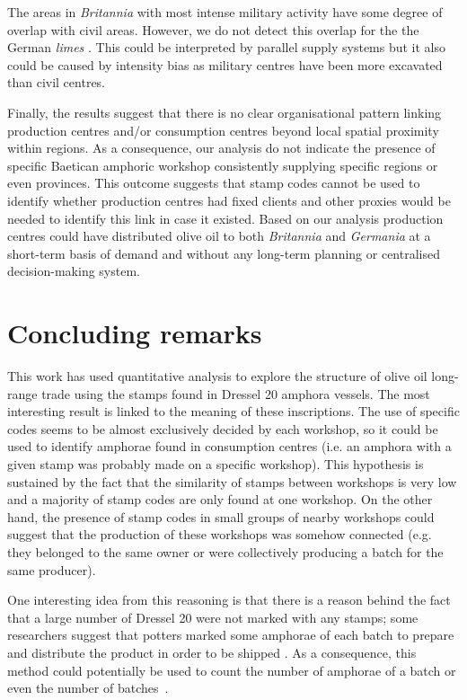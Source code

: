 The areas in \textit{Britannia} with most intense military activity have some degree of overlap with civil areas. However, we do not detect this overlap for the the German \textit{limes} \citep{xanten2018}. This could be interpreted by parallel supply systems but it also could be caused by intensity bias as military centres have been more excavated than civil centres.


Finally, the results suggest that there is no clear organisational pattern linking production centres and/or consumption centres beyond local spatial proximity within regions. As a consequence, our analysis do not indicate the presence of specific Baetican amphoric workshop consistently supplying specific regions or even provinces.  This outcome suggests that stamp codes cannot be used to identify whether production centres had fixed clients and other proxies would be needed to identify this link in case it existed. Based on our analysis production centres could have distributed olive oil to both \textit{Britannia} and \textit{Germania} at a short-term basis of demand and without any long-term planning or centralised decision-making system.

\section{Concluding remarks}
\label{sec:8}

This work has used quantitative analysis to explore the structure of olive oil long-range trade using the stamps found in Dressel 20 amphora vessels. The most interesting result is linked to the meaning of these inscriptions. The use of specific codes seems to be almost exclusively decided by each workshop, so it could be used to identify amphorae found in consumption centres (i.e. an amphora with a given stamp was probably made on a specific workshop). This hypothesis is sustained by the fact that the similarity of stamps between workshops is very low and a majority of stamp codes are only found at one workshop. On the other hand, the presence of stamp codes in small groups of nearby workshops could suggest that the production of these workshops was somehow connected (e.g. they belonged to the same owner or were collectively producing a batch for the same producer).
 
One interesting idea from this reasoning is that there is a reason behind the fact that a large number of Dressel 20 were not marked with any stamps; some researchers suggest that potters marked some amphorae of each batch to prepare and distribute the product in order to be shipped \citep{berni_millet_epigrafianforica_2008}. As a consequence, this method could potentially be used to count the number of amphorae of a batch or even the number of batches~\citep{juanmorostesis}. 

